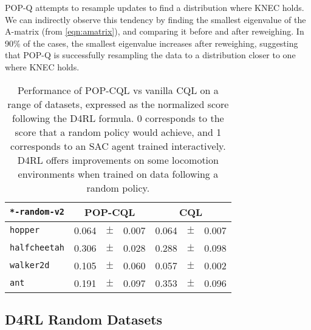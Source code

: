POP-Q attempts to resample updates to find a distribution where KNEC holds. We can indirectly observe this tendency by finding the smallest eigenvalue of the A-matrix (from \cref{eqn:amatrix}), and comparing it before and after reweighing. In 90\% of the cases, the smallest eigenvalue increases after reweighing, suggesting that POP-Q is successfully resampling the data to a distribution closer to one where KNEC holds.

\begin{table}[t]
  \centering
  \begin{tabular}{lr@{\,}c@{\,}lr@{\,}c@{\,}l}\hline\hline
    \texttt{*-random-v2} & \multicolumn{3}{c}{POP-CQL} & \multicolumn{3}{c}{CQL}
    \\\hline
    \texttt{hopper}      & 0.064                       & $\pm$                   & 0.007 & 0.064 & $\pm$ & 0.007
    \\	\texttt{halfcheetah} & 0.306 & $\pm$ & 0.028 & 0.288 & $\pm$ & 0.098
    \\	\texttt{walker2d}    & 0.105 & $\pm$ & 0.060 & 0.057 & $\pm$ & 0.002
    \\	\texttt{ant}         & 0.191 & $\pm$ & 0.097 & 0.353 & $\pm$ & 0.096
    \\ \hline\hline
  \end{tabular}
  \caption{Performance of POP-CQL vs vanilla CQL on a range of datasets, expressed as the normalized score following the D4RL formula. 0 corresponds to the score that a random policy would achieve, and 1 corresponds to an SAC agent trained interactively. D4RL offers improvements on some locomotion environments when trained on data following a random policy. }
  \label{tab:resultsd4rl}
\end{table}



\subsection{D4RL Random Datasets}

